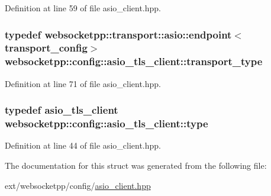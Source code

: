 Definition at line 59 of file asio\+\_\+client.\+hpp.

\hypertarget{structwebsocketpp_1_1config_1_1asio__tls__client_a24a07a9b1d8bb48d67317a46acb6eef6}{}
\subsubsection[{transport\+\_\+type}]{\setlength{\rightskip}{0pt plus 5cm}typedef {\bf websocketpp\+::transport\+::asio\+::endpoint}$<${\bf transport\+\_\+config}$>$ {\bf websocketpp\+::config\+::asio\+\_\+tls\+\_\+client\+::transport\+\_\+type}}\label{structwebsocketpp_1_1config_1_1asio__tls__client_a24a07a9b1d8bb48d67317a46acb6eef6}


Definition at line 71 of file asio\+\_\+client.\+hpp.

\hypertarget{structwebsocketpp_1_1config_1_1asio__tls__client_ac326e9357688f306119aacc22639259e}{}
\subsubsection[{type}]{\setlength{\rightskip}{0pt plus 5cm}typedef {\bf asio\+\_\+tls\+\_\+client} {\bf websocketpp\+::config\+::asio\+\_\+tls\+\_\+client\+::type}}\label{structwebsocketpp_1_1config_1_1asio__tls__client_ac326e9357688f306119aacc22639259e}


Definition at line 44 of file asio\+\_\+client.\+hpp.



The documentation for this struct was generated from the following file\+:\begin{DoxyCompactItemize}
\item 
ext/websocketpp/config/\hyperlink{asio__client_8hpp}{asio\+\_\+client.\+hpp}\end{DoxyCompactItemize}
